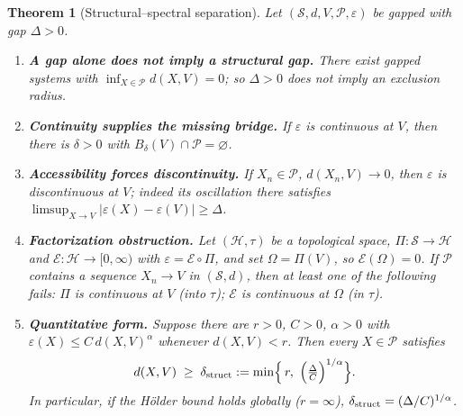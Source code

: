 \documentclass[11pt,a4paper]{article}
\newtheorem{theorem}{Theorem}
\theoremstyle{definition}
\theoremstyle{remark}
\newcommand{\Pset}{\mathcal{P}}
\begin{document}
\begin{theorem}[Structural--spectral separation]\label{thm:sep}
Let $(\mathcal S,d,V,\Pset,\varepsilon)$ be gapped with gap $\Delta>0$.
\begin{enumerate}[label=(\alph*)]
\item \textbf{A gap alone does not imply a structural gap.} There exist gapped systems with $\inf_{X\in\Pset}d(X,V)=0$; so $\Delta>0$ does not imply an exclusion radius.
\item \textbf{Continuity supplies the missing bridge.} If $\varepsilon$ is continuous at $V$, then there is $\delta>0$ with $B_\delta(V)\cap\Pset=\varnothing$.
\item \textbf{Accessibility forces discontinuity.} If $X_n\in\Pset$, $d(X_n,V)\to0$, then $\varepsilon$ is discontinuous at $V$; indeed its oscillation there satisfies $\limsup_{X\to V}|\varepsilon(X)-\varepsilon(V)|\ge\Delta$.
\item \textbf{Factorization obstruction.} Let $(\mathcal H,\tau)$ be a topological space, $\Pi:\mathcal S\to\mathcal H$ and $\mathcal E:\mathcal H\to[0,\infty)$ with $\varepsilon=\mathcal E\circ\Pi$, and set $\Omega=\Pi(V)$, so $\mathcal E(\Omega)=0$. If $\Pset$ contains a sequence $X_n\to V$ in $(\mathcal S,d)$, then at least one of the following fails: $\Pi$ is continuous at $V$ (into $\tau$); $\mathcal E$ is continuous at $\Omega$ (in $\tau$).
\item \textbf{Quantitative form.} Suppose there are $r>0$, $C>0$, $\alpha>0$ with $\varepsilon(X)\le C\,d(X,V)^\alpha$ whenever $d(X,V)<r$. Then every $X\in\Pset$ satisfies
\begin{equation}\label{eq:holder}
d(X,V)\;\ge\;\delta_{\rm struct}:=\min\!\Big\{\,r,\ \Big(\tfrac{\Delta}{C}\Big)^{1/\alpha}\Big\}.
\end{equation}
In particular, if the Hölder bound holds globally ($r=\infty$), $\delta_{\rm struct}=(\Delta/C)^{1/\alpha}$.
\end{enumerate}
\end{theorem}
\end{document}
